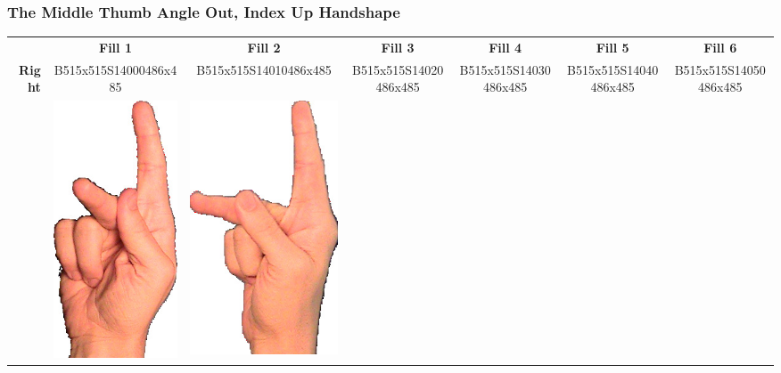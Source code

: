 \documentclass{article}
\begin{document}
\subsubsection{The Middle Thumb Angle Out, Index Up Handshape}

\begin{center}
\begin{tabular}{r*{6}{c}}
&\textbf{Fill 1}&\textbf{Fill 2}&\textbf{Fill 3}&\textbf{Fill 4}&\textbf{Fill 5}&\textbf{Fill 6}\\
\multirow{2}{*}{\textbf{Right}}&
B515x515S14000486x485&
B515x515S14010486x485&
B515x515S14020486x485&
B515x515S14030486x485&
B515x515S14040486x485&
B515x515S14050486x485\\
&
\includegraphics[scale=0.1]{images/03-12-1.jpg}&
\includegraphics[scale=0.1]{images/03-12-2.jpg}&

\end{tabular}
\end{center}
\end{document}
